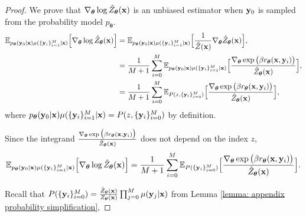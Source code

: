 \begin{proof}




We prove that $\nabla_{\boldsymbol\theta}\log\hat{Z}_{\boldsymbol\theta}(\mathbf{x})$ is an unbiased estimator when $\mathbf{y}_0$ is sampled from the probability model $p_{\boldsymbol\theta}$.
\begin{align*}
\mathbb{E}_{p_{\boldsymbol\theta}(\mathbf{y}_0 | \mathbf{x}) 
\mu(\{\mathbf{y}_i\}_{i=1}^M | \mathbf{x})
}
\Big[
\nabla_{\boldsymbol\theta} \log \hat{Z}_{\boldsymbol\theta}(\mathbf{x})
\Big]
& =
\mathbb{E}_{p_{\boldsymbol\theta}(\mathbf{y}_0 | \mathbf{x}) 
\mu(\{\mathbf{y}_i\}_{i=1}^M | \mathbf{x})
}
\Big[
\frac{1} {\hat{Z}(\mathbf{x})}
\nabla_{\boldsymbol\theta} \hat{Z}_{\boldsymbol\theta}(\mathbf{x})
\Big],
\\ \nonumber
& =
\frac{1} {M + 1}
\sum_{i=0}^M
\mathbb{E}_{p_{\boldsymbol\theta}(\mathbf{y}_0 | \mathbf{x}) 
\mu(\{\mathbf{y}_i\}_{i=1}^M | \mathbf{x})
}
\Big[
\frac{\nabla_{\boldsymbol\theta}\exp\big(
\beta
r_{\boldsymbol\theta}(\mathbf{x}, \mathbf{y}_i)
\big)
}
{\hat{Z}_{\boldsymbol\theta}(\mathbf{x})}
\Big],
\\ \nonumber
& =
\frac{1} {M + 1}
\sum_{i=0}^M
\mathbb{E}_{
P(z, \{\mathbf{y}_i \}_{i=0}^M)
}
\Big[
\frac{\nabla_{\boldsymbol\theta}\exp
\big( 
\beta
r_{\boldsymbol\theta}(\mathbf{x}, \mathbf{y}_i)
\big)
} 
{\hat{Z}_{\boldsymbol\theta}(\mathbf{x})}
\Big],
\end{align*}
where 
$p_{\boldsymbol\theta}(\mathbf{y}_0 | \mathbf{x}) 
\mu(\{\mathbf{y}_i\}_{i=1}^M | \mathbf{x})
=
P(z, \{\mathbf{y}_i \}_{i=0}^M)
$ by definition.

Since the integrand 
$
\frac{\nabla_{\boldsymbol\theta}\exp\big(
\beta
r_{\boldsymbol\theta}(\mathbf{x}, \mathbf{y}_i)
\big)
} 
{\hat{Z}_{\boldsymbol\theta}(\mathbf{x})}
$ does not depend on the index $z$,
\begin{align}
\label{eq: appendix derivation unbiased gradient 2}
\mathbb{E}_{p_{\boldsymbol\theta}(\mathbf{y}_0 | \mathbf{x}) 
\mu(\{\mathbf{y}_i\}_{i=1}^M | \mathbf{x})
}
\Big[
\nabla_{\boldsymbol\theta} \log \hat{Z}_{\boldsymbol\theta}(\mathbf{x})
\Big]
=
\frac{1} {M + 1}
\sum_{i=0}^M
\mathbb{E}_{
P(\{\mathbf{y}_i \}_{i=0}^M)
}
\Big[
\frac{\nabla_{\boldsymbol\theta}\exp\big(
\beta
r_{\boldsymbol\theta}(\mathbf{x}, \mathbf{y}_i)
\big)
} 
{\hat{Z}_{\boldsymbol\theta}(\mathbf{x})}
\Big].
\end{align}


Recall that 
$P(\{\mathbf{y}_i\}_{i=0}^M)
=
\frac{\hat{Z}_{\boldsymbol\theta}(\mathbf{x})} {Z_{\boldsymbol\theta}(\mathbf{x})}
\prod_{j=0}^M \mu(\mathbf{y}_j | \mathbf{x})$ from Lemma \ref{lemma: appendix probability simplification},


\end{proof}
